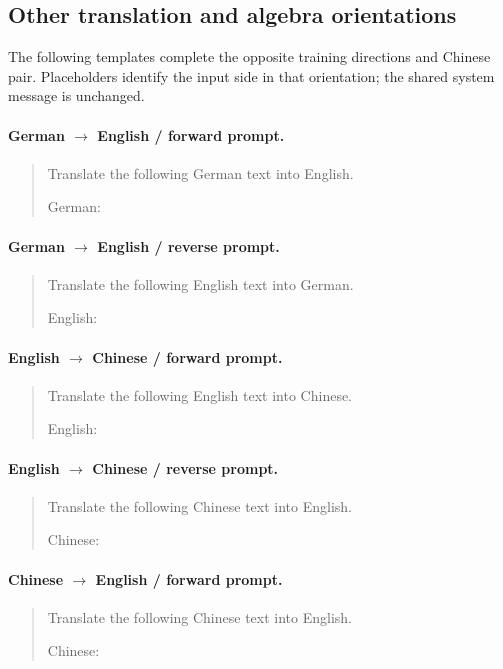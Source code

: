 \subsection{Other translation and algebra orientations}
The following templates complete the opposite training directions and Chinese pair. Placeholders identify the input side in that orientation; the shared system message is unchanged.
\paragraph{German $\to$ English / forward prompt.}
\begin{quote}\small\ttfamily
Translate the following German text into English.\par \par German:\par <INPUT A>
\end{quote}
\paragraph{German $\to$ English / reverse prompt.}
\begin{quote}\small\ttfamily
Translate the following English text into German.\par \par English:\par <INPUT B>
\end{quote}
\paragraph{English $\to$ Chinese / forward prompt.}
\begin{quote}\small\ttfamily
Translate the following English text into Chinese.\par \par English:\par <INPUT A>
\end{quote}
\paragraph{English $\to$ Chinese / reverse prompt.}
\begin{quote}\small\ttfamily
Translate the following Chinese text into English.\par \par Chinese:\par <INPUT B>
\end{quote}
\paragraph{Chinese $\to$ English / forward prompt.}
\begin{quote}\small\ttfamily
Translate the following Chinese text into English.\par \par Chinese:\par <INPUT A>
\end{quote}
